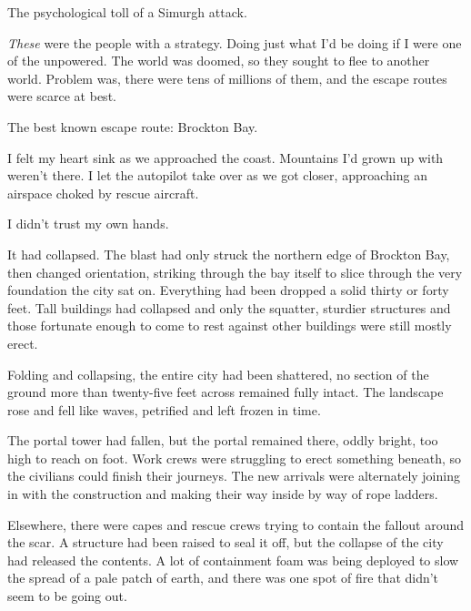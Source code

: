 The psychological toll of a Simurgh attack.



\emph{These} were the people with a strategy.  Doing just what I'd be doing if I were one of the unpowered.  The world was doomed, so they sought to flee to another world.  Problem was, there were tens of millions of them, and the escape routes were scarce at best.



The best known escape route: Brockton Bay.



I felt my heart sink as we approached the coast.  Mountains I'd grown up with weren't there.  I let the autopilot take over as we got closer, approaching an airspace choked by rescue aircraft.



I didn't trust my own hands.



It had collapsed.  The blast had only struck the northern edge of Brockton Bay, then changed orientation, striking through the bay itself to slice through the very foundation the city sat on.  Everything had been dropped a solid thirty or forty feet.  Tall buildings had collapsed and only the squatter, sturdier structures and those fortunate enough to come to rest against other buildings were still mostly erect.



Folding and collapsing, the entire city had been shattered, no section of the ground more than twenty-five feet across remained fully intact.  The landscape rose and fell like waves, petrified and left frozen in time.



The portal tower had fallen, but the portal remained there, oddly bright, too high to reach on foot.  Work crews were struggling to erect something beneath, so the civilians could finish their journeys.  The new arrivals were alternately joining in with the construction and making their way inside by way of rope ladders.



Elsewhere, there were capes and rescue crews trying to contain the fallout around the scar.  A structure had been raised to seal it off, but the collapse of the city had released the contents.  A lot of containment foam was being deployed to slow the spread of a pale patch of earth, and there was one spot of fire that didn't seem to be going out.



